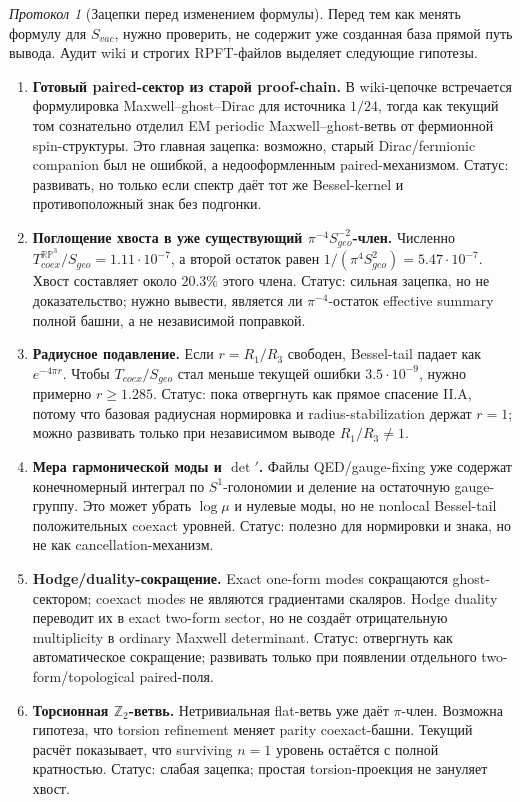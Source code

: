 \documentclass[12pt,a4paper]{report}
\theoremstyle{remark}
\newtheorem{protocol}{Протокол}[chapter]
\begin{document}
\begin{protocol}[Зацепки перед изменением формулы]
Перед тем как менять формулу для \(S_{vac}\), нужно проверить, не содержит уже созданная база прямой путь вывода. Аудит wiki и строгих RPFT-файлов выделяет следующие гипотезы.
\begin{enumerate}
    \item \textbf{Готовый paired-сектор из старой proof-chain.} В wiki-цепочке встречается формулировка Maxwell--ghost--Dirac для источника \(1/24\), тогда как текущий том сознательно отделил EM periodic Maxwell--ghost-ветвь от фермионной spin-структуры. Это главная зацепка: возможно, старый Dirac/fermionic companion был не ошибкой, а недооформленным paired-механизмом. Статус: развивать, но только если спектр даёт тот же Bessel-kernel и противоположный знак без подгонки.
    \item \textbf{Поглощение хвоста в уже существующий \(\pi^{-4}S_{geo}^{-2}\)-член.} Численно \(T_{coex}^{\mathbb{RP}^3}/S_{geo}=1.11\cdot10^{-7}\), а второй остаток равен \(1/(\pi^4S_{geo}^2)=5.47\cdot10^{-7}\). Хвост составляет около \(20.3\%\) этого члена. Статус: сильная зацепка, но не доказательство; нужно вывести, является ли \(\pi^{-4}\)-остаток effective summary полной башни, а не независимой поправкой.
    \item \textbf{Радиусное подавление.} Если \(r=R_1/R_3\) свободен, Bessel-tail падает как \(e^{-4\pi r}\). Чтобы \(T_{coex}/S_{geo}\) стал меньше текущей ошибки \(3.5\cdot10^{-9}\), нужно примерно \(r\geq1.285\). Статус: пока отвергнуть как прямое спасение II.A, потому что базовая радиусная нормировка и radius-stabilization держат \(r=1\); можно развивать только при независимом выводе \(R_1/R_3\neq1\).
    \item \textbf{Мера гармонической моды и \(\det\prime\).} Файлы QED/gauge-fixing уже содержат конечномерный интеграл по \(S^1\)-голономии и деление на остаточную gauge-группу. Это может убрать \(\log\mu\) и нулевые моды, но не nonlocal Bessel-tail положительных coexact уровней. Статус: полезно для нормировки и знака, но не как cancellation-механизм.
    \item \textbf{Hodge/duality-сокращение.} Exact one-form modes сокращаются ghost-сектором; coexact modes не являются градиентами скаляров. Hodge duality переводит их в exact two-form sector, но не создаёт отрицательную multiplicity в ordinary Maxwell determinant. Статус: отвергнуть как автоматическое сокращение; развивать только при появлении отдельного two-form/topological paired-поля.
    \item \textbf{Торсионная \(\mathbb Z_2\)-ветвь.} Нетривиальная flat-ветвь уже даёт \(\pi\)-член. Возможна гипотеза, что torsion refinement меняет parity coexact-башни. Текущий расчёт показывает, что surviving \(n=1\) уровень остаётся с полной кратностью. Статус: слабая зацепка; простая torsion-проекция не зануляет хвост.

\end{enumerate}
\end{protocol}
\end{document}
